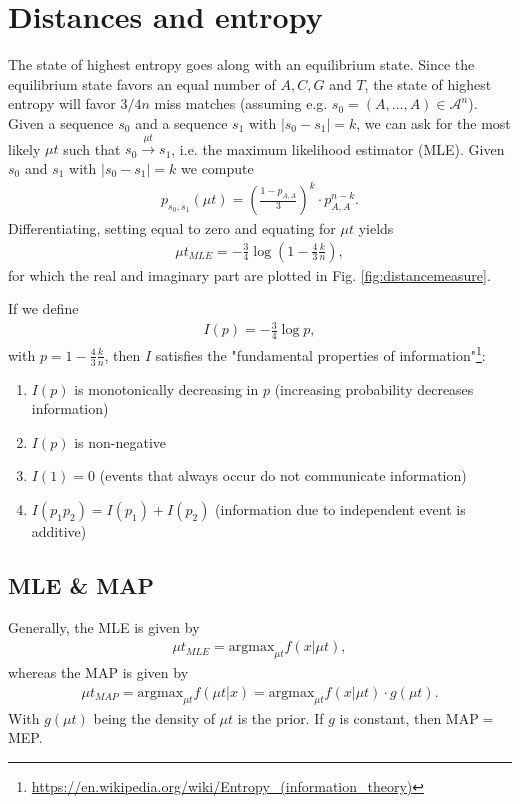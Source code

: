 \documentclass[12pt]{article}
\begin{document}
\section{Distances and entropy}
The state of highest entropy goes along with an equilibrium state. Since the equilibrium state favors an equal number of $A,C,G$ and $T$, the state of highest entropy will favor $3/4n$ miss matches (assuming e.g. $s_0=\left(A,...,A\right)\in\mathcal{A}^n$). Given a sequence $s_0$ and a sequence $s_1$ with $|s_0-s_1| = k$, we can ask for the most likely $\mu t$ such that $s_0 \xrightarrow{\mu t} s_1$, i.e. the maximum likelihood estimator (MLE). Given  $s_0$ and $s_1$ with $|s_0-s_1| = k$ we compute 
\begin{align*}
	p_{s_0,s_1}(\mu t)= \left(\frac{1-p_{A,A}}{3}\right)^k \cdot p_{A,A}^{n-k}.
\end{align*}
Differentiating, setting equal to zero and equating for $\mu t$ yields
\begin{align}
	\mu t_{MLE} = -\frac34 \log \left(1-\frac43 \frac{k}{n}\right),
\end{align}
for which the real and imaginary part are plotted in Fig. \ref{fig:distancemeasure}.

If we define 
\begin{align}
	I(p) = -\frac34 \log p,
\end{align}
with $p=1-\frac43\frac{k}{n}$, then $I$ satisfies the "fundamental properties of information"\footnote{\url{https://en.wikipedia.org/wiki/Entropy_(information_theory)}}:
\begin{enumerate}
	\item $I(p)$ is monotonically decreasing in $p$ (increasing probability decreases information)
	\item $I(p)$ is non-negative 
	\item $I(1)=0$ (events that always occur do not communicate information)
	\item $I(p_1 p_2) = I(p_1)+I(p_2)$ (information due to independent event is additive)
\end{enumerate}
\subsection{MLE \& MAP}
Generally, the MLE is given by
\begin{align}
	\mu t_{MLE} = \text{argmax}_{\mu t} f(x | \mu t), 
\end{align}
whereas the MAP is given by
\begin{align}
		\mu t_{MAP} = \text{argmax}_{\mu t} f(\mu t | x) =\text{argmax}_{\mu t} f(x | \mu t) \cdot g(\mu t).
\end{align}
With $g(\mu t)$ being the density of $\mu t$ is the prior. If $g$ is constant, then MAP$=$MEP.
\end{document}
